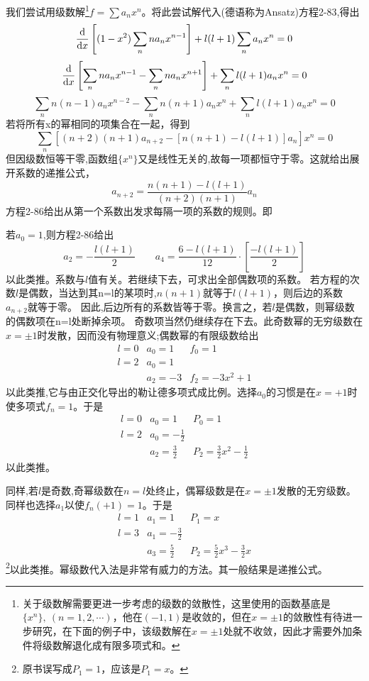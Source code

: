 我们尝试用级数解\footnote{关于级数解需要更进一步考虑的级数的敛散性，这里使用的函数基底是$\{x^n\}, \ (n=1,2,\cdots)$，他在$(-1,1)$是收敛的，但在$x=\pm 1$的敛散性有待进一步研究，在下面的例子中，该级数解在$x=\pm 1$处就不收敛，因此才需要外加条件将级数解退化成有限多项式和。}$f=\sum a_nx^n$。将此尝试解代入(德语称为Ansatz)方程2-83,得出
\[\dv{x}\left[(1-x^2)\sum_n na_nx^{n-1} \right]+l(l+1)\sum_n a_nx^n=0\]
\[\dv{x}\left[\sum_n na_nx^{n-1}-\sum_n na_nx^{n+1} \right]+\sum_n l(l+1) a_nx^n=0\]
\[\sum_n n(n-1)a_nx^{n-2}-\sum_n n(n+1)a_nx^n+\sum_n l(l+1) a_nx^n=0 \tag{2-84}\]
若将所有x的幂相同的项集合在一起，得到
\[\sum_n \left [ (n+2)(n+1)a_{n+2}-[n(n+1)-l(l+1)]a_n \right ]x^n=0 \tag{2-85}\]
但因级数恒等干零,函数组$\{x^n\}$又是线性无关的,故每一项都恒守于零。这就给出展开系数的递推公式，
\[a_{n+2}=\frac{n(n+1)-l(l+1)}{(n+2)(n+1)}a_n \tag{2-86}\]
方程2-86给出从第一个系数出发求每隔一项的系数的规则。即

若$a_0=1$,则方程2-86给出
\[a_2=-\frac{l(l+1)}{2} \qquad a_4=\frac{6-l(l+1)}{12} \cdot \left[\frac{-l(l+1)}{2}\right]\]
以此类推。系数与$l$值有关。若继续下去，可求出全部偶数项的系数。
若方程的次数$l$是偶数，当达到其n=l的某项时,$n(n+1)$就等于$l(l+1)$，则后边的系数$a_{n+2}$就等于零。
因此,后边所有的系数皆等于零。换言之，若$l$是偶数，则幂级数的偶数项在n=l处断掉余项。
奇数项当然仍继续存在下去。此奇数幂的无穷级数在$x= \pm 1$时发散，因而没有物理意义;偶数幂的有限级数给出
\[
\begin{array}{lll}
    l=0 & a_0=1 & f_0=1 \\
    l=2 & a_0=1 &  \\
     & a_2=-3 & f_2=-3x^2+1 
\end{array}    
\]
以此类推,它与由正交化导出的勒让德多项式成比例。选择$a_0$的习惯是在$x=+1$时使多项式$f_n=1$。于是
\[
\begin{array}{lll}
    l=0 & a_0=1 & P_0=1 \\
    l=2 & a_0=-\frac{1}{2} &  \\
     & a_2=\frac{3}{2} & P_2=\frac{3}{2}x^2-\frac{1}{2} 
\end{array}    
\]
以此类推。

同样,若$l$是奇数,奇幂级数在$n=l$处终止，偶幂级数是在$x= \pm 1$发散的无穷级数。同样也选择$a_1$以使$f_n(+1)=1$。于是
\[
\begin{array}{lll}
    l=1 & a_1=1 & P_1=x \\
    l=3 & a_1=-\frac{3}{2} &  \\
     & a_3=\frac{5}{2} & P_2=\frac{5}{2}x^3-\frac{3}{2}x 
\end{array}    
\]
\footnote{原书误写成$P_1=1$，应该是$P_1=x$。}以此类推。幂级数代入法是非常有威力的方法。其一般结果是递推公式。

